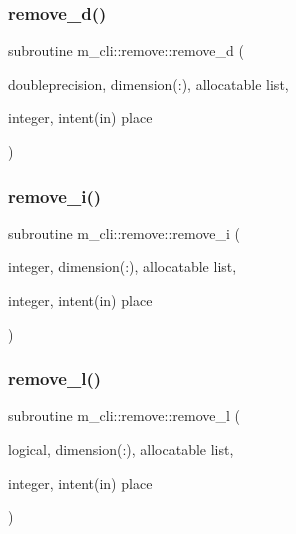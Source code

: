 \mbox{\label{interfacem__cli_1_1remove_ab1f0d48faa67f5ada3b7c67b6c4e6efe}} 
\subsubsection{\texorpdfstring{remove\+\_\+d()}{remove\_d()}}
{\footnotesize\ttfamily subroutine m\+\_\+cli\+::remove\+::remove\+\_\+d (\begin{DoxyParamCaption}\item[{doubleprecision, dimension(\+:), allocatable}]{list,  }\item[{integer, intent(in)}]{place }\end{DoxyParamCaption})\hspace{0.3cm}{\ttfamily [private]}}

\mbox{\label{interfacem__cli_1_1remove_ada40f4218cbbff786409693c0e5b4e8f}} 
\subsubsection{\texorpdfstring{remove\+\_\+i()}{remove\_i()}}
{\footnotesize\ttfamily subroutine m\+\_\+cli\+::remove\+::remove\+\_\+i (\begin{DoxyParamCaption}\item[{integer, dimension(\+:), allocatable}]{list,  }\item[{integer, intent(in)}]{place }\end{DoxyParamCaption})\hspace{0.3cm}{\ttfamily [private]}}

\mbox{\label{interfacem__cli_1_1remove_a934593716f18cbe5c58e2b0af7ddb38f}} 
\subsubsection{\texorpdfstring{remove\+\_\+l()}{remove\_l()}}
{\footnotesize\ttfamily subroutine m\+\_\+cli\+::remove\+::remove\+\_\+l (\begin{DoxyParamCaption}\item[{logical, dimension(\+:), allocatable}]{list,  }\item[{integer, intent(in)}]{place }\end{DoxyParamCaption})\hspace{0.3cm}{\ttfamily [private]}}

